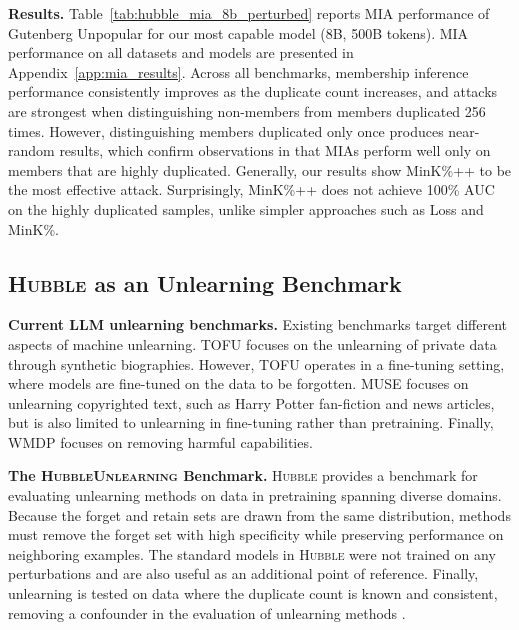 \documentclass{article} %
\begin{document}
\textbf{Results.} Table~\ref{tab:hubble_mia_8b_perturbed} reports MIA performance of Gutenberg Unpopular for our most capable model (8B, 500B tokens). MIA performance on all datasets and models are presented in Appendix~\ref{app:mia_results}. Across all benchmarks, membership inference performance consistently improves as the duplicate count increases, and attacks are strongest when distinguishing non-members from members duplicated 256 times.  However, distinguishing members duplicated only once produces near-random results, which confirm observations in \citet{duan2024membershipinferenceattackswork} that MIAs perform well only on members that are highly duplicated. Generally, our results show MinK\%++ to be the most effective attack. Surprisingly, MinK\%++ does not achieve 100\% AUC on the highly duplicated samples, unlike simpler approaches such as Loss and MinK\%.

\subsection{\textsc{Hubble} as an Unlearning Benchmark}

\textbf{Current LLM unlearning benchmarks.} Existing benchmarks target different aspects of machine unlearning. TOFU \citep{tofu} focuses on the unlearning of private data through  synthetic biographies. However, TOFU operates in a fine-tuning setting, where models are fine-tuned on the data to be forgotten. MUSE \citep{muse} focuses on unlearning copyrighted text, such as Harry Potter fan-fiction and news articles, but is also limited to unlearning in fine-tuning rather than pretraining. Finally, WMDP \citep{wmdp} focuses on removing harmful capabilities.

\textbf{The \textsc{HubbleUnlearning} Benchmark.} \textsc{Hubble} provides a benchmark for evaluating unlearning methods on data in pretraining spanning diverse domains. Because the forget and retain sets are drawn from the same distribution, methods must remove the forget set with high specificity while preserving performance on neighboring examples. The standard models in \textsc{Hubble} were not trained on any perturbations and are also useful as an additional point of reference. Finally, unlearning is tested on data where the duplicate count is known and consistent, removing a confounder in the evaluation of unlearning methods \citep{krishnan2025dataunlearnedequally}.
\end{document}
